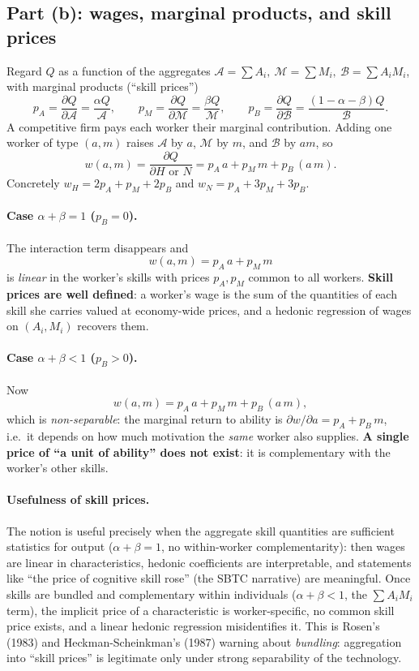 \documentclass[11pt]{article}
\begin{document}
\subsection*{Part (b): wages, marginal products, and skill prices}

Regard $Q$ as a function of the aggregates
$\mathcal A=\sum A_i,\ \mathcal M=\sum M_i,\ \mathcal B=\sum A_iM_i$, with
marginal products (``skill prices'')
\[
p_A=\frac{\partial Q}{\partial\mathcal A}=\frac{\alpha Q}{\mathcal A},\qquad
p_M=\frac{\partial Q}{\partial\mathcal M}=\frac{\beta Q}{\mathcal M},\qquad
p_B=\frac{\partial Q}{\partial\mathcal B}=\frac{(1-\alpha-\beta)Q}{\mathcal B}.
\]
A competitive firm pays each worker their marginal contribution. Adding one
worker of type $(a,m)$ raises $\mathcal A$ by $a$, $\mathcal M$ by $m$, and
$\mathcal B$ by $am$, so
\begin{equation}
w(a,m)=\frac{\partial Q}{\partial H\text{ or }N}=p_A\,a+p_M\,m+p_B\,(a\,m).
\end{equation}
Concretely $w_H=2p_A+p_M+2p_B$ and $w_N=p_A+3p_M+3p_B$.

\paragraph{Case $\alpha+\beta=1$ ($p_B=0$).} The interaction term disappears and
\[
\boxed{\,w(a,m)=p_A\,a+p_M\,m\,}
\]
is \emph{linear} in the worker's skills with prices $p_A,p_M$ common to all
workers. \textbf{Skill prices are well defined}: a worker's wage is the sum of
the quantities of each skill she carries valued at economy-wide prices, and a
hedonic regression of wages on $(A_i,M_i)$ recovers them.

\paragraph{Case $\alpha+\beta<1$ ($p_B>0$).} Now
\[
w(a,m)=p_A\,a+p_M\,m+p_B\,(a\,m),
\]
which is \emph{non-separable}: the marginal return to ability is
$\partial w/\partial a=p_A+p_B\,m$, i.e.\ it depends on how much motivation the
\emph{same} worker also supplies. \textbf{A single price of ``a unit of
ability'' does not exist}: it is complementary with the worker's other skills.

\paragraph{Usefulness of skill prices.} The notion is useful precisely when the
aggregate skill quantities are sufficient statistics for output
($\alpha+\beta=1$, no within-worker complementarity): then wages are linear in
characteristics, hedonic coefficients are interpretable, and statements like
``the price of cognitive skill rose'' (the SBTC narrative) are meaningful. Once
skills are bundled and complementary within individuals ($\alpha+\beta<1$, the
$\sum A_iM_i$ term), the implicit price of a characteristic is worker-specific,
no common skill price exists, and a linear hedonic regression misidentifies it.
This is Rosen's (1983) and Heckman-Scheinkman's (1987) warning about
\emph{bundling}: aggregation into ``skill prices'' is legitimate only under
strong separability of the technology.
\end{document}
